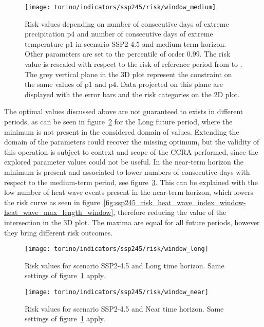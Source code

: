 \begin{figure}[h]
  \centering
  \texttt{[image: torino/indicators/ssp245/risk/window\_medium]}
  \caption{Risk values depending on number of consecutive days of extreme precipitation $\mathrm{p4}$ and number of consecutive days of extreme temperature $\mathrm{p1}$ in scenario SSP2-4.5 and medium-term horizon. Other parameters are set to the percentile of order 0.99. The risk value is rescaled with respect to the risk of reference period from  to . The grey vertical plane in the 3D plot represent the constraint on the same values of $\mathrm{p1}$ and $\mathrm{p4}$. Data projected on this plane are displayed with the error bars and the risk categories on the 2D plot.}
  \label{fig:ssp245_risk_window_medium}
\end{figure}

The optimal values discussed above are not guaranteed to exists in different periods, as can be seen in figure~\ref{fig:ssp245_risk_window_long} for the Long future period, where the minimum is not present in the considered domain of values. Extending the domain of the parameters could recover the missing optimum, but the validity of this operation is subject to context and scope of the \gls{CCRA} performed, since the explored parameter values could not be useful.
In the near-term horizon the minimum is present and associated to lower numbers of consecutive days with respect to the medium-term period, see figure~\ref{fig:ssp245_risk_window_near}. This can be explained with the low number of heat wave events present in the near-term horizon, which lowers the risk curve as seen in figure~\ref{fig:ssp245_risk_heat_wave_index_window-heat_wave_max_length_window}, therefore reducing the value of the intersection in the 3D plot.
The maxima are equal for all future periods, however they bring different risk outcomes.

\begin{figure}[h]
  \centering
  \texttt{[image: torino/indicators/ssp245/risk/window\_long]}
  \caption{Risk values for scenario SSP2-4.5 and Long time horizon. Same settings of figure~\ref{fig:ssp245_risk_window_medium} apply.}
  \label{fig:ssp245_risk_window_long}
\end{figure}

\begin{figure}[h]
  \centering
  \texttt{[image: torino/indicators/ssp245/risk/window\_near]}
  \caption{Risk values for scenario SSP2-4.5 and Near time horizon. Same settings of figure~\ref{fig:ssp245_risk_window_medium} apply.}
  \label{fig:ssp245_risk_window_near}
\end{figure}


